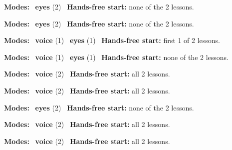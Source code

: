 \expandafter\def\csname hlchaptermodality6\endcsname{%
  {\small\noindent
    \textbf{Modes:} \hlsightsign{}~\textbf{eyes} (2)\quad
    \hlvoicesign{}~\textbf{Hands-free start:} none of the 2 lessons.%
    \par}\medskip
}

\expandafter\def\csname hlchaptermodality7\endcsname{%
  {\small\noindent
    \textbf{Modes:} \hlsightsign{}~\textbf{eyes} (2)\quad
    \hlvoicesign{}~\textbf{Hands-free start:} none of the 2 lessons.%
    \par}\medskip
}

\expandafter\def\csname hlchaptermodality8\endcsname{%
  {\small\noindent
    \textbf{Modes:} \hlvoicesign{}~\textbf{voice} (1) \quad \hlsightsign{}~\textbf{eyes} (1)\quad
    \hlvoicesign{}~\textbf{Hands-free start:} first 1 of 2 lessons.%
    \par}\medskip
}

\expandafter\def\csname hlchaptermodality9\endcsname{%
  {\small\noindent
    \textbf{Modes:} \hlvoicesign{}~\textbf{voice} (1) \quad \hlsightsign{}~\textbf{eyes} (1)\quad
    \hlvoicesign{}~\textbf{Hands-free start:} none of the 2 lessons.%
    \par}\medskip
}

\expandafter\def\csname hlchaptermodality10\endcsname{%
  {\small\noindent
    \textbf{Modes:} \hlvoicesign{}~\textbf{voice} (2)\quad
    \hlvoicesign{}~\textbf{Hands-free start:} all 2 lessons.%
    \par}\medskip
}

\expandafter\def\csname hlchaptermodality11\endcsname{%
  {\small\noindent
    \textbf{Modes:} \hlvoicesign{}~\textbf{voice} (2)\quad
    \hlvoicesign{}~\textbf{Hands-free start:} all 2 lessons.%
    \par}\medskip
}

\expandafter\def\csname hlchaptermodality12\endcsname{%
  {\small\noindent
    \textbf{Modes:} \hlsightsign{}~\textbf{eyes} (2)\quad
    \hlvoicesign{}~\textbf{Hands-free start:} none of the 2 lessons.%
    \par}\medskip
}

\expandafter\def\csname hlchaptermodality13\endcsname{%
  {\small\noindent
    \textbf{Modes:} \hlvoicesign{}~\textbf{voice} (2)\quad
    \hlvoicesign{}~\textbf{Hands-free start:} all 2 lessons.%
    \par}\medskip
}

\expandafter\def\csname hlchaptermodality14\endcsname{%
  {\small\noindent
    \textbf{Modes:} \hlvoicesign{}~\textbf{voice} (2)\quad
    \hlvoicesign{}~\textbf{Hands-free start:} all 2 lessons.%
    \par}\medskip
}

